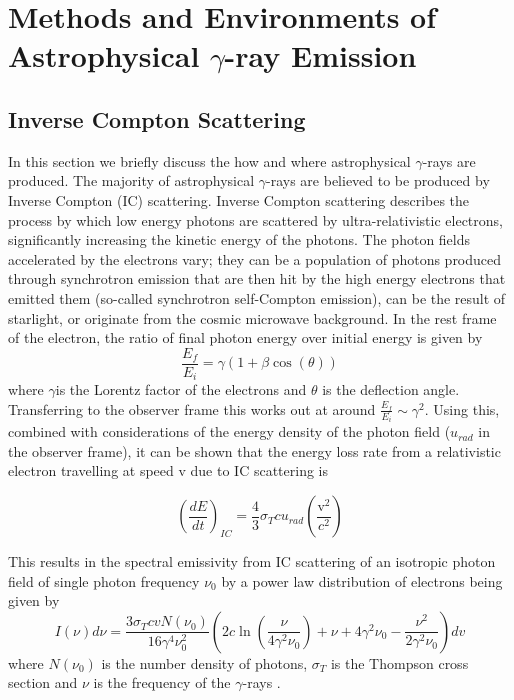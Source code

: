 \section{Methods and Environments of Astrophysical \ensuremath{\gamma}-ray Emission}
\subsection{Inverse Compton Scattering}

In this section we briefly discuss the how and where astrophysical $\gamma$-rays are produced. The majority of astrophysical $\gamma$-rays are believed to be produced by Inverse Compton (IC) scattering. Inverse Compton scattering describes the process by which low energy photons are scattered by ultra-relativistic electrons, significantly increasing the kinetic energy of the photons. The photon fields accelerated by the electrons vary; they can be a population of photons produced through synchrotron emission that are then hit by the high energy electrons that emitted them (so-called synchrotron self-Compton emission), can be the result of starlight, or originate from the cosmic microwave background. In the rest frame of the electron, the ratio of final photon energy over initial energy is given by
\begin{equation}
    \frac{E_f}{E_i}=\gamma (1+\beta \cos(\theta))
\end{equation}
where $\gamma$is the Lorentz factor of the electrons and $\theta$ is the deflection angle. Transferring to the observer frame this works out at around $\frac{E_f}{E_i}\sim \gamma^2$. Using this, combined with considerations of the energy density of the photon field ($u_{rad}$ in the observer frame), it can be shown \cite{longair} that the energy loss rate from a relativistic electron travelling at speed $\mathrm{v}$ due to IC scattering is

\begin{equation}
    \left(\frac{dE}{dt}\right)_{IC}=\frac{4}{3}\sigma_T c u_{rad}\left(\frac{\mathrm{v}^2}{c^2}\right)
\end{equation}

This results in the spectral emissivity from IC scattering of an isotropic photon field of single photon frequency $\nu_0$ by a power law distribution of electrons being given by 
\begin{equation}
    I(\nu)d\nu=\frac{3\sigma_TcvN(\nu_0)}{16\gamma^4\nu_0^2}\left(2c\ln\left(\frac{\nu}{4\gamma^2\nu_0}\right)+\nu+4\gamma^2\nu_0-\frac{\nu^2}{2\gamma^2\nu_0}\right)dv
\end{equation}
where $N(\nu_0)$ is the number density of photons, $\sigma_T$ is the Thompson cross section and $\nu$ is the frequency of the $\gamma$-rays \cite{blumenthal}.


